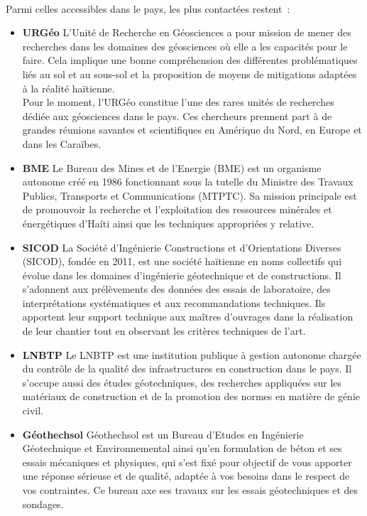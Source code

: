        \paragraph{}
        Parmi celles accessibles dans le pays, les plus contactées restent :
        \begin{itemize}
            \item \textbf{URGéo}
        L'Unité de Recherche en Géosciences a pour mission de mener des recherches dans les
        domaines des géosciences où elle a les capacités pour le faire.
        Cela implique une bonne compréhension des différentes problématiques liés au sol et
        au sous-sol et la proposition de moyens de mitigations adaptées à la réalité haïtienne.
        \cite{mission_urgeo}
        \\
        Pour le moment, l’URGéo constitue l’une des rares unités de recherches dédiée aux
        géosciences dans le pays. 
        Ces chercheurs prennent part à de grandes réunions savantes et scientifiques en
        Amérique du Nord, en Europe et dans les Caraïbes.
        \cite{urgeo_nouvelliste}
            \item \textbf{BME}
        Le Bureau des Mines et de l’Energie (BME) est un organisme autonome créé en 
        1986 fonctionnant sous la tutelle du Ministre des Travaux Publics, Transports 
        et Communications (MTPTC). Sa mission principale est de promouvoir la recherche
        et l'exploitation des ressources minérales et énergétiques d'Haíti ainsi que les 
        techniques appropriées y relative.
            \item \textbf{SICOD}
        La  Société d’Ingénierie Constructions et d’Orientations Diverses (SICOD),
         fondée en 2011, est une société haïtienne en noms collectifs qui évolue dans les domaines d’ingénierie géotechnique et de constructions.
         Il s'adonnent aux prélèvements des données des essais de laboratoire, des interprétations systématiques et aux recommandations techniques. 
         Ils apportent leur support technique aux maîtres d'ouvrages dans la réalisation de leur chantier tout en observant les critères techniques de l'art.
            \item \textbf{LNBTP}
        Le LNBTP est une institution publique à gestion autonome chargée du contrôle de la qualité des infrastructures en construction dans le pays. Il s'occupe 
        aussi des études géotechniques, des recherches appliquées sur les matériaux de construction et de la promotion des normes en matière de génie civil.
            \item \textbf{Géothechsol}
        Géothechsol est un Bureau d’Etudes en Ingénierie Géotechnique et Environnemental ainsi qu’en formulation de béton et ses essais mécaniques et physiques,
         qui s’est fixé pour objectif de vous apporter une réponse sérieuse et de qualité, adaptée à vos besoins dans le respect de vos contraintes.
         Ce bureau axe ses travaux sur les essais géotechniques et des sondages.
        \end{itemize}
        
